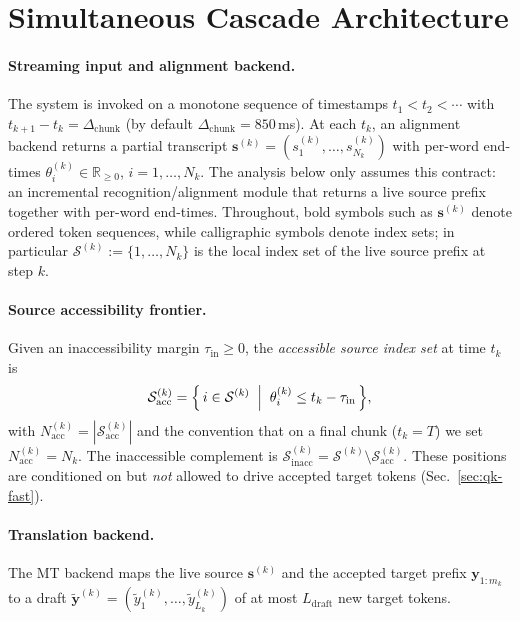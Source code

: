 \documentclass[11pt,twocolumn]{article}
\begin{document}
\section{Simultaneous Cascade Architecture}
\label{sec:cascade}

\paragraph{Streaming input and alignment backend.}
The system is invoked on a monotone sequence of timestamps
$t_1 < t_2 < \cdots$ with $t_{k+1} - t_k = \Delta_{\mathrm{chunk}}$
(by default $\Delta_{\mathrm{chunk}} = 850$\,ms).
At each $t_k$, an alignment backend returns a partial transcript
$\mathbf{s}^{(k)} = (s^{(k)}_1, \ldots, s^{(k)}_{N_k})$ with per-word end-times
$\theta^{(k)}_i \in \mathbb{R}_{\geq 0}$, $i = 1, \ldots, N_k$. The analysis
below only assumes this contract: an incremental recognition/alignment module
that returns a live source prefix together with per-word end-times.
Throughout, bold symbols such as $\mathbf{s}^{(k)}$ denote ordered token
sequences, while calligraphic symbols denote index sets; in particular
$\mathcal{S}^{(k)} := \{1,\ldots,N_k\}$ is the local index set of the live
source prefix at step $k$.

\paragraph{Source accessibility frontier.}
Given an inaccessibility margin $\tau_{\mathrm{in}} \geq 0$, the
\emph{accessible source index set} at time $t_k$ is
\begin{equation}
  \mathcal{S}^{(k)}_{\mathrm{acc}}
  = \Bigl\{\, i \in \mathcal{S}^{(k)}
     \;\Bigm|\; \theta^{(k)}_i \leq t_k - \tau_{\mathrm{in}} \,\Bigr\},
  \label{eq:frontier}
\end{equation}
with $N^{(k)}_{\mathrm{acc}} = |\mathcal{S}^{(k)}_{\mathrm{acc}}|$ and the
convention that on a final chunk ($t_k = T$) we set
$N^{(k)}_{\mathrm{acc}} = N_k$.
The inaccessible complement is
$\mathcal{S}^{(k)}_{\mathrm{inacc}} = \mathcal{S}^{(k)} \setminus
\mathcal{S}^{(k)}_{\mathrm{acc}}$.
These positions are conditioned on but \emph{not} allowed to drive accepted
target tokens (Sec.~\ref{sec:qk-fast}).

\paragraph{Translation backend.}
The MT backend maps the live source $\mathbf{s}^{(k)}$ and the accepted target
prefix $\mathbf{y}_{1:m_k}$ to a draft $\widetilde{\mathbf{y}}^{(k)} =
(\widetilde{y}^{(k)}_1, \ldots, \widetilde{y}^{(k)}_{L_k})$ of at most
$L_{\mathrm{draft}}$ new target tokens.
\end{document}
